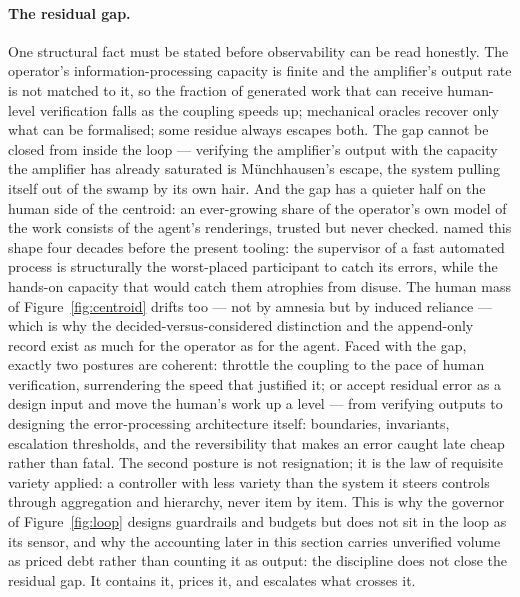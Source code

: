 \documentclass[11pt,a4paper,twocolumn]{article}
\begin{document}
\paragraph{The residual gap.} One structural fact must be stated
before observability can be read honestly. The operator's
information-processing capacity is finite and the amplifier's
output rate is not matched to it, so the fraction of generated
work that can receive human-level verification falls as the
coupling speeds up; mechanical oracles recover only what can be
formalised; some residue always escapes both. The gap cannot be
closed from inside the loop --- verifying the amplifier's output
with the capacity the amplifier has already saturated is
M\"unchhausen's escape, the system pulling itself out of the
swamp by its own hair. And the gap has a quieter half on the
human side of the centroid: an ever-growing share of the
operator's own model of the work consists of the agent's
renderings, trusted but never checked. \citet{bainbridge1983}
named this shape four decades before the present tooling: the
supervisor of a fast automated process is structurally the
worst-placed participant to catch its errors, while the hands-on
capacity that would catch them atrophies from disuse. The human
mass of Figure~\ref{fig:centroid} drifts too --- not by amnesia
but by induced reliance --- which is why the
decided-versus-considered distinction and the append-only record
exist as much for the operator as for the agent. Faced with the
gap, exactly two postures are coherent: throttle the coupling to
the pace of human verification, surrendering the speed that
justified it; or accept residual error as a design input and
move the human's work up a level --- from verifying outputs to
designing the error-processing architecture itself: boundaries,
invariants, escalation thresholds, and the reversibility that
makes an error caught late cheap rather than fatal. The second
posture is not resignation; it is the law of requisite variety
\citep{ashby1956cybernetics} applied: a controller with less
variety than the system it steers controls through aggregation
and hierarchy, never item by item. This is why the governor of
Figure~\ref{fig:loop} designs guardrails and budgets but does
not sit in the loop as its sensor, and why the accounting later
in this section carries unverified volume as priced debt rather
than counting it as output: the discipline does not close the
residual gap. It contains it, prices it, and escalates what
crosses it.
\end{document}
